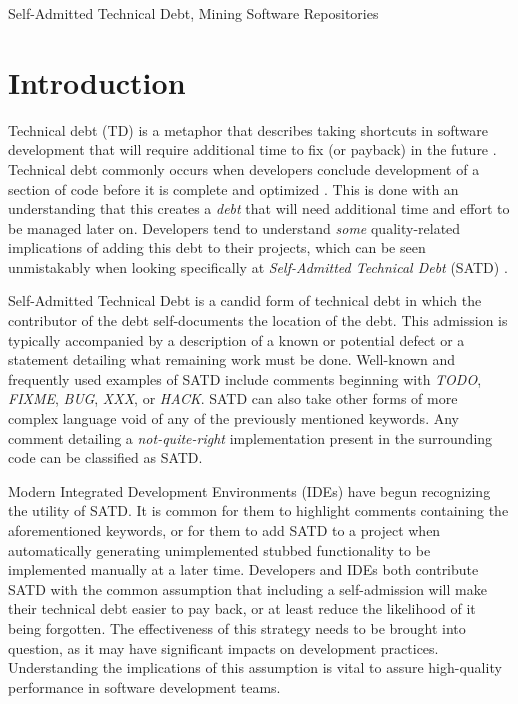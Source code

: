 \documentclass[3p]{elsarticle}
\begin{document}
\begin{frontmatter}
\begin{abstract}
\end{abstract}

\begin{keyword}
Self-Admitted Technical Debt, Mining Software Repositories
\end{keyword}

\end{frontmatter}

\section{Introduction}
Technical debt (TD) is a metaphor that describes taking shortcuts in software development that will require additional time to fix (or payback) in the future \cite{Kruchten}. Technical debt commonly occurs when developers conclude development of a section of code before it is complete and optimized \cite{cunningham1992wycash}. This is done with an understanding that this creates a \textit{debt} that will need additional time and effort to be managed later on. Developers tend to understand \textit{some} quality-related implications of adding this debt to their projects, which can be seen unmistakably when looking specifically at \textit{Self-Admitted Technical Debt} (SATD) \cite{potdar2014exploratory}. %

Self-Admitted Technical Debt is a candid form of technical debt in which the contributor of the debt self-documents the location of the debt. This admission is typically accompanied by a description of a known or potential defect or a statement detailing what remaining work must be done. Well-known and frequently used examples of SATD include comments beginning with \textit{TODO}, \textit{FIXME}, \textit{BUG}, \textit{XXX}, or \textit{HACK}. SATD can also take other forms of more complex language void of any of the previously mentioned keywords. Any comment detailing a \textit{not-quite-right} implementation present in the surrounding code can be classified as SATD.

Modern Integrated Development Environments (IDEs) have begun recognizing the utility of SATD. It is common for them to highlight comments containing the aforementioned keywords, or for them to add SATD to a project when automatically generating unimplemented stubbed functionality to be implemented manually at a later time. Developers and IDEs both contribute SATD with the common assumption that including a self-admission will make their technical debt easier to pay back, or at least reduce the likelihood of it being forgotten. The effectiveness of this strategy needs to be brought into question, as it may have significant impacts on development practices. Understanding the implications of this assumption is vital to assure high-quality performance in software development teams.
\end{document}
